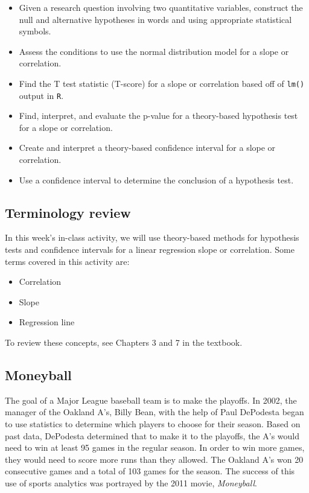 \documentclass[
]{report}
\begin{document}
\begin{itemize}
\item
  Given a research question involving two quantitative variables, construct the null and alternative hypotheses
  in words and using appropriate statistical symbols.
\item
  Assess the conditions to use the normal distribution model for a slope or correlation.
\item
  Find the T test statistic (T-score) for a slope or correlation based off of \texttt{lm()} output in \texttt{R}.
\item
  Find, interpret, and evaluate the p-value for a theory-based hypothesis test for a slope or correlation.
\item
  Create and interpret a theory-based confidence interval for a slope or correlation.
\item
  Use a confidence interval to determine the conclusion of a hypothesis test.
\end{itemize}

\hypertarget{terminology-review-24}{%
\subsection{Terminology review}\label{terminology-review-24}}

In this week's in-class activity, we will use theory-based methods for hypothesis tests and confidence intervals for a linear regression slope or correlation. Some terms covered in this activity are:

\begin{itemize}
\item
  Correlation
\item
  Slope
\item
  Regression line
\end{itemize}

To review these concepts, see Chapters 3 and 7 in the textbook.

\hypertarget{moneyball}{%
\subsection{Moneyball}\label{moneyball}}

The goal of a Major League baseball team is to make the playoffs. In 2002, the manager of the Oakland A's, Billy Bean, with the help of Paul DePodesta began to use statistics to determine which players to choose for their season. Based on past data, DePodesta determined that to make it to the playoffs, the A's would need to win at least 95 games in the regular season. In order to win more games, they would need to score more runs than they allowed. The Oakland A's won 20 consecutive games and a total of 103 games for the season. The success of this use of sports analytics was portrayed by the 2011 movie, \emph{Moneyball}.
\end{document}
